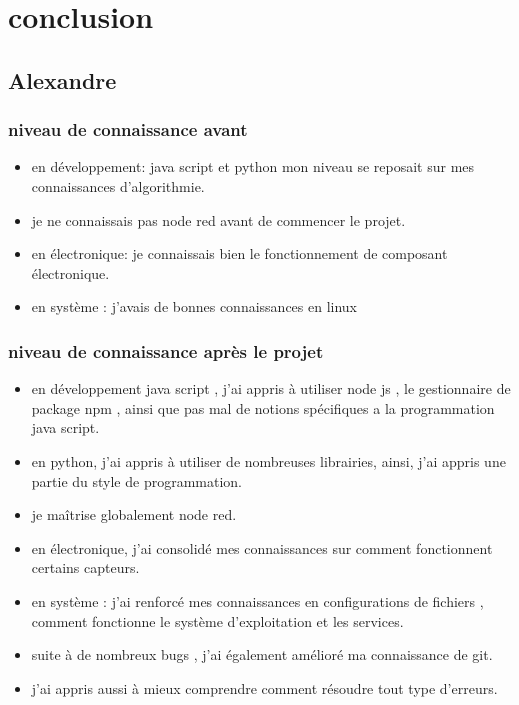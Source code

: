 \chapter{conclusion}


\section{Alexandre}
\subsection{ niveau de connaissance avant }
\begin{itemize}
    \item en développement: java script et python  mon niveau se reposait sur mes connaissances d'algorithmie.

    \item je ne connaissais pas node red avant de commencer le projet.

    \item en électronique: je connaissais bien le fonctionnement de composant électronique.

    \item en système : j'avais de bonnes connaissances en linux 
 \end{itemize}    
\subsection{niveau de connaissance après le projet }
\begin{itemize}
    \item en développement java script , j'ai appris à utiliser node js , le gestionnaire de package npm , ainsi que pas mal de notions spécifiques a la programmation java script.

    \item en python, j'ai appris à utiliser de nombreuses librairies, ainsi, j'ai appris une partie du style de programmation.
    
   \item je maîtrise globalement node red. 

    \item en électronique, j'ai consolidé mes connaissances sur comment fonctionnent certains capteurs. 

    \item en système : j'ai renforcé mes connaissances en configurations de fichiers , comment fonctionne le système d'exploitation et les services.

   \item suite à de nombreux bugs , j'ai également amélioré ma connaissance de git. 
    
    \item j'ai appris aussi à mieux comprendre comment résoudre tout type d'erreurs.

 \end{itemize}    
